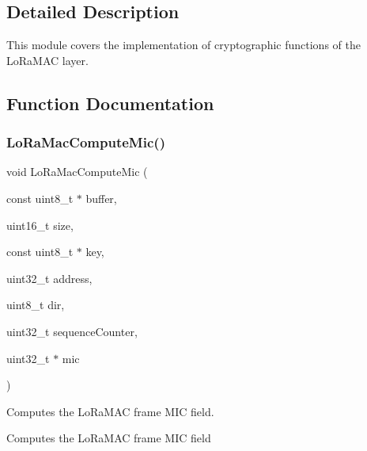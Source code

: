 \subsection{Detailed Description}
This module covers the implementation of cryptographic functions of the Lo\+Ra\+M\+AC layer. 

\subsection{Function Documentation}
\mbox{\label{group__LORAMAC__CRYPTO_ga6ee265070494b83255e7fdc4dff985da}} 
\subsubsection{\texorpdfstring{Lo\+Ra\+Mac\+Compute\+Mic()}{LoRaMacComputeMic()}}
{\footnotesize\ttfamily void Lo\+Ra\+Mac\+Compute\+Mic (\begin{DoxyParamCaption}\item[{const uint8\+\_\+t $\ast$}]{buffer,  }\item[{uint16\+\_\+t}]{size,  }\item[{const uint8\+\_\+t $\ast$}]{key,  }\item[{uint32\+\_\+t}]{address,  }\item[{uint8\+\_\+t}]{dir,  }\item[{uint32\+\_\+t}]{sequence\+Counter,  }\item[{uint32\+\_\+t $\ast$}]{mic }\end{DoxyParamCaption})}



Computes the Lo\+Ra\+M\+AC frame M\+IC field. 

Computes the Lo\+Ra\+M\+AC frame M\+IC field


